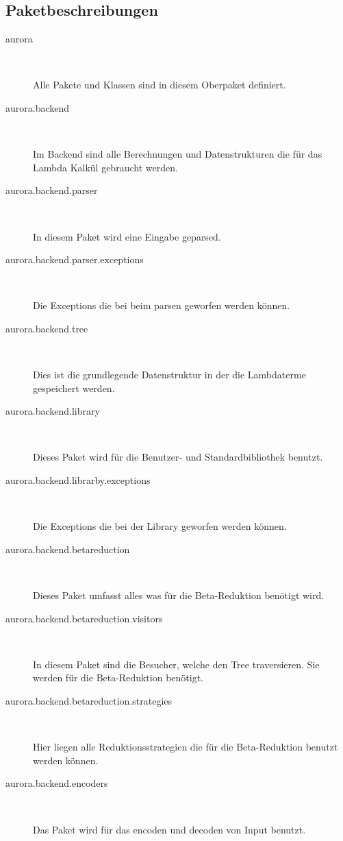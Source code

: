 \documentclass[parskip=full,11pt,twoside]{scrbook}
\begin{document}
\subsection{Paketbeschreibungen}
\begin{description}
	
	
	\item[aurora] ~\par
	Alle Pakete und Klassen sind in diesem Oberpaket definiert.
	
	\item[aurora.backend] ~\par
	Im Backend sind alle Berechnungen und Datenstrukturen die für das Lambda Kalkül gebraucht werden. 
	
	\item[aurora.backend.parser] ~\par
	In diesem Paket wird eine Eingabe geparsed.
	\item[aurora.backend.parser.exceptions] ~\par
	Die Exceptions die bei beim parsen geworfen werden können.

	\item[aurora.backend.tree] ~\par
	Dies ist die grundlegende Datenstruktur in der die Lambdaterme gespeichert werden.
	
	\item[aurora.backend.library] ~\par
	Dieses Paket wird für die Benutzer- und Standardbibliothek benutzt.
	
	\item[aurora.backend.librarby.exceptions] ~\par
	Die Exceptions die bei der Library geworfen werden können.
	
	\item[aurora.backend.betareduction] ~\par
	Dieses Paket umfasst alles was für die Beta-Reduktion benötigt wird.
	
	\item[aurora.backend.betareduction.visitors] ~\par
	 In diesem Paket sind die Besucher, welche den Tree traversieren. Sie werden für die Beta-Reduktion benötigt.  
	\item[aurora.backend.betareduction.strategies] ~\par
	Hier liegen alle Reduktionsstrategien die für die Beta-Reduktion benutzt werden können.

	\item[aurora.backend.encoders] ~\par
	Das Paket wird für das encoden und decoden von Input benutzt.
	

\end{description}
\end{document}
